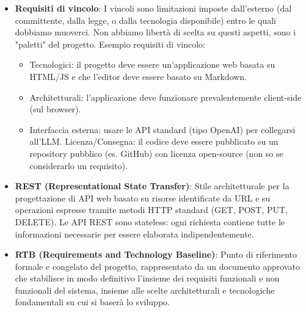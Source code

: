 \documentclass[11pt,a4paper]{article}
\begin{document}
\begin{itemize}
\item \textbf{Requisiti di vincolo}: I vincoli sono limitazioni imposte dall'esterno (dal committente, dalla legge, o dalla tecnologia disponibile) entro le quali dobbiamo muoverci. Non abbiamo libertà di scelta su questi aspetti, sono i "paletti" del progetto.
Esempio requisiti di vincolo:
\begin{itemize}
\item Tecnologici: il progetto deve essere un'applicazione web basata su HTML/JS e che l'editor deve essere basato su Markdown. 
\item Architetturali: l'applicazione deve funzionare prevalentemente client-side (sul browser).
\item Interfaccia esterna: usare le API standard (tipo OpenAI) per collegarsi all'LLM.
Licenza/Consegna: il codice deve essere pubblicato su un repository pubblico (es. GitHub) con licenza open-source (non so se considerarlo un requisito).
\end{itemize}

\item \textbf{REST (Representational State Transfer)}: Stile architetturale per la progettazione di API web basato su risorse identificate da URL e su operazioni espresse tramite metodi HTTP standard (GET, POST, PUT, DELETE). Le API REST sono stateless: ogni richiesta contiene tutte le informazioni necessarie per essere elaborata indipendentemente.

\item \textbf{RTB (Requirements and Technology Baseline)}: Punto di riferimento formale e congelato del progetto, rappresentato da un documento approvato che stabilisce in modo definitivo l’insieme dei requisiti funzionali e non funzionali del sistema, insieme alle scelte architetturali e tecnologiche fondamentali su cui si baserà lo sviluppo. 
\end{itemize}
\newpage
\end{document}
